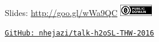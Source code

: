 \documentclass[12pt,t]{beamer}
\begin{document}
\begin{frame}[c]{}

\Large

Slides: \url{http://goo.gl/wWa9QC} \quad
\includegraphics[height=5mm]{Figs/cc-zero.png}

\vspace{10mm}

\href{https://github.com/nhejazi/talk-h2oSL-THW-2016}
{\tt GitHub: nhejazi/talk-h2oSL-THW-2016}

\end{frame}
\end{document}
